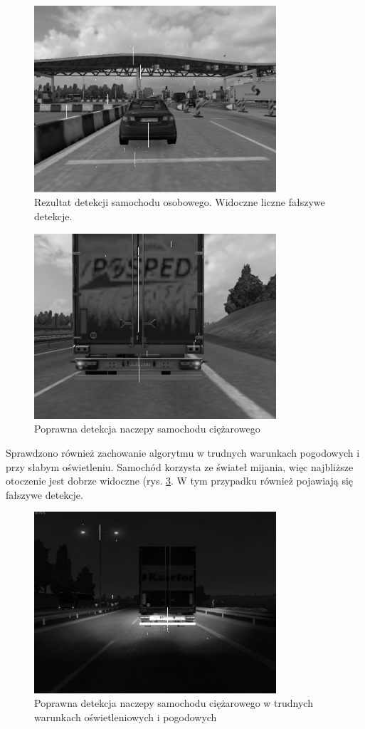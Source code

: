 \begin{figure}
  \centering
  \includegraphics[width=9cm]{img/alg3_res.jpg}
  \caption{Rezultat detekcji samochodu osobowego. Widoczne liczne fałszywe detekcje.}
  \label{fig:alg3_res1}
\end{figure}

\begin{figure}
  \centering
  \includegraphics[width=9cm]{img/alg3_res2.jpg}
  \caption{Poprawna detekcja naczepy samochodu ciężarowego}
  \label{fig:alg3_res2}
\end{figure}

Sprawdzono również zachowanie algorytmu w trudnych warunkach pogodowych i przy słabym oświetleniu. 
Samochód korzysta ze świateł mijania, więc najbliższe otoczenie jest dobrze widoczne (rys. \ref{fig:alg3_rain_late}. 
W tym przypadku również pojawiają się fałszywe detekcje.

\begin{figure}
  \centering
  \includegraphics[width=9cm]{img/alg3_res3.jpg}
  \caption{Poprawna detekcja naczepy samochodu ciężarowego w trudnych warunkach oświetleniowych i pogodowych}
  \label{fig:alg3_rain_late}
\end{figure}

